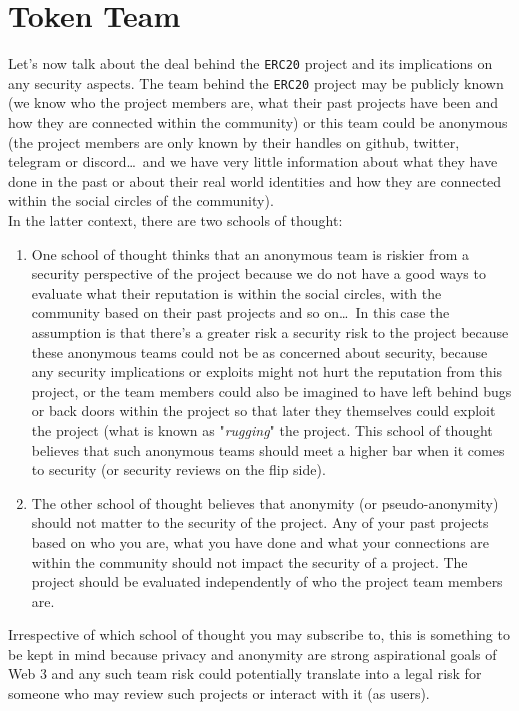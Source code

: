 \section{Token Team}
Let's now talk about the deal behind the \verb|ERC20| project and its implications on any security aspects. The team behind the \verb|ERC20| project may be publicly known (we know who the project members are, what their past projects have been and how they are connected within the community) or this team could be anonymous (the project members are only known by their handles on github, twitter, telegram or discord\dots\, and we have very little information about what they have done in the past or about their real world identities and how they are connected within the social circles of the community).\\

In the latter context, there are two schools of thought:
\begin{enumerate}
\item One school of thought thinks that an anonymous team is riskier from a security perspective of the project because we do not have a good ways to evaluate what their reputation is within the social circles, with the community based on their past projects and so on\dots\, In this case the assumption is that there's a greater risk a security risk to the project because these anonymous teams could not be as concerned about security, because any security implications or exploits might not hurt the reputation from this project, or the team members could also be imagined to have left behind bugs or back doors within the project so that later they themselves could exploit the project (what is known as "\textit{rugging}" the project. This school of thought believes that such anonymous teams should meet a higher bar when it comes to security (or security reviews on the flip side).
\item The other school of thought believes that anonymity (or pseudo-anonymity) should not matter to the security of the project. Any of your past projects based on who you are, what you have done and what your connections are within the community should not impact the security of a project. The project should be evaluated independently of who the project team members are.
\end{enumerate}

Irrespective of which school of thought you may subscribe to, this is something to be kept in mind because privacy and anonymity are strong aspirational goals of Web 3 and any such team risk could potentially translate into a legal risk for someone who may review such projects or interact with it (as users).

